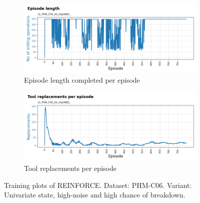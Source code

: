 \documentclass[a4paper, 12pt]{article}
\begin{document}
\begin{figure}[h]
	\begin{subfigure}[b]{0.5\textwidth}
		\centering
		\includegraphics[width=\textwidth]{images/TrainingPlots/11_PHM_C06_SS_HighNBD__Episode_Length.png}  
		\caption{Episode length completed per episode}
		\label{fig:C06eplen}
	\end{subfigure}
	\hfill
	\begin{subfigure}[b]{0.5\textwidth}
		\centering
		\includegraphics[width=\textwidth]{images/TrainingPlots/11_PHM_C06_SS_HighNBD__Tool_Replacements.png}  
		\caption{Tool replacements per episode}
		\label{fig:C06toolrep}
	\end{subfigure} 
	\caption{Training plots of REINFORCE. Dataset: PHM-C06. Variant: Univariate state, high-noise and high chance of breakdown.}
	\label{fig:C06trplots}
\end{figure}
\end{document}
